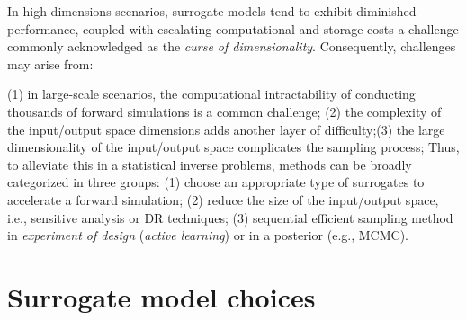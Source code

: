 In high dimensions scenarios, surrogate models tend to exhibit diminished performance, coupled with escalating computational and storage costs-a challenge commonly acknowledged as the \textit{curse of dimensionality}. Consequently, challenges may arise from: 
 
 (1) in large-scale scenarios, the computational intractability of conducting thousands of forward simulations is a common challenge; (2) the complexity of the input/output space dimensions adds another layer of difficulty;(3) the large dimensionality of the input/output space complicates the sampling process;
 Thus, to alleviate this in a statistical inverse problems, methods can be broadly categorized in three groups: (1) choose an appropriate type of surrogates to accelerate a forward simulation; (2) reduce the size of the input/output space, i.e., sensitive analysis or \acrlong{DR} techniques; (3) sequential efficient sampling method in \textit{experiment of design} (\textit{active learning}) or in a posterior (e.g., \acrshort{MCMC}).


\section{Surrogate model choices}
 

